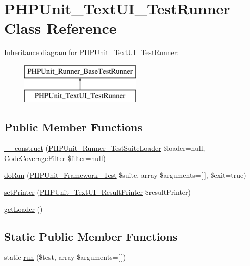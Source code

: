 \hypertarget{class_p_h_p_unit___text_u_i___test_runner}{}\section{P\+H\+P\+Unit\+\_\+\+Text\+U\+I\+\_\+\+Test\+Runner Class Reference}
\label{class_p_h_p_unit___text_u_i___test_runner}
Inheritance diagram for P\+H\+P\+Unit\+\_\+\+Text\+U\+I\+\_\+\+Test\+Runner\+:\begin{figure}[H]
\begin{center}
\leavevmode
\includegraphics[height=2.000000cm]{class_p_h_p_unit___text_u_i___test_runner}
\end{center}
\end{figure}
\subsection*{Public Member Functions}
\begin{DoxyCompactItemize}
\item 
\mbox{\hyperlink{class_p_h_p_unit___text_u_i___test_runner_a6b4c927d4da8c114a92c4dd84ba25adb}{\+\_\+\+\_\+construct}} (\mbox{\hyperlink{interface_p_h_p_unit___runner___test_suite_loader}{P\+H\+P\+Unit\+\_\+\+Runner\+\_\+\+Test\+Suite\+Loader}} \$loader=null, Code\+Coverage\+Filter \$filter=null)
\item 
\mbox{\hyperlink{class_p_h_p_unit___text_u_i___test_runner_afb0cb597ca8178ca4c865d62b1ff7d48}{do\+Run}} (\mbox{\hyperlink{interface_p_h_p_unit___framework___test}{P\+H\+P\+Unit\+\_\+\+Framework\+\_\+\+Test}} \$suite, array \$arguments=\mbox{[}$\,$\mbox{]}, \$exit=true)
\item 
\mbox{\hyperlink{class_p_h_p_unit___text_u_i___test_runner_ae3026497b1f5c470fc9a4cf0f9d105e8}{set\+Printer}} (\mbox{\hyperlink{class_p_h_p_unit___text_u_i___result_printer}{P\+H\+P\+Unit\+\_\+\+Text\+U\+I\+\_\+\+Result\+Printer}} \$result\+Printer)
\item 
\mbox{\hyperlink{class_p_h_p_unit___text_u_i___test_runner_a461527c1de39a5520c52951b8f03d99f}{get\+Loader}} ()
\end{DoxyCompactItemize}
\subsection*{Static Public Member Functions}
\begin{DoxyCompactItemize}
\item 
static \mbox{\hyperlink{class_p_h_p_unit___text_u_i___test_runner_ae412677338e52cdc40120872fbdf30fe}{run}} (\$test, array \$arguments=\mbox{[}$\,$\mbox{]})
\end{DoxyCompactItemize}
